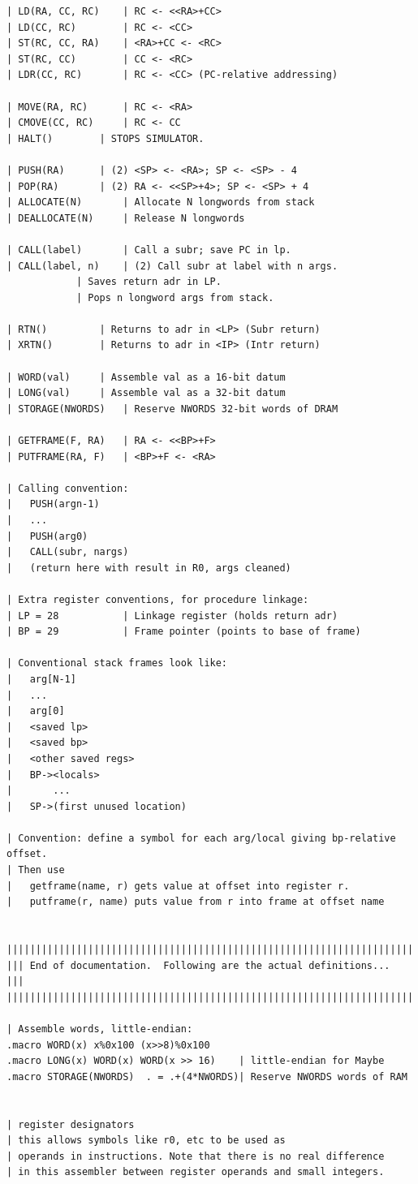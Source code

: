 \documentclass{article}
\begin{document}
\begin{lstlisting}
| LD(RA, CC, RC)	| RC <- <<RA>+CC>
| LD(CC, RC)		| RC <- <CC>
| ST(RC, CC, RA)	| <RA>+CC <- <RC>
| ST(RC, CC)		| CC <- <RC>
| LDR(CC, RC)		| RC <- <CC> (PC-relative addressing)

| MOVE(RA, RC)		| RC <- <RA>
| CMOVE(CC, RC)		| RC <- CC
| HALT()		| STOPS SIMULATOR.

| PUSH(RA)		| (2) <SP> <- <RA>; SP <- <SP> - 4
| POP(RA)		| (2) RA <- <<SP>+4>; SP <- <SP> + 4
| ALLOCATE(N)		| Allocate N longwords from stack
| DEALLOCATE(N)		| Release N longwords

| CALL(label)		| Call a subr; save PC in lp.
| CALL(label, n)	| (2) Call subr at label with n args.
			| Saves return adr in LP.
			| Pops n longword args from stack.

| RTN()			| Returns to adr in <LP> (Subr return)
| XRTN()		| Returns to adr in <IP> (Intr return)

| WORD(val)		| Assemble val as a 16-bit datum
| LONG(val)		| Assemble val as a 32-bit datum
| STORAGE(NWORDS)	| Reserve NWORDS 32-bit words of DRAM

| GETFRAME(F, RA)	| RA <- <<BP>+F>
| PUTFRAME(RA, F)	| <BP>+F <- <RA>

| Calling convention:
|	PUSH(argn-1)
|	...
|	PUSH(arg0)
|	CALL(subr, nargs)
|	(return here with result in R0, args cleaned)

| Extra register conventions, for procedure linkage:
| LP = 28			| Linkage register (holds return adr)
| BP = 29			| Frame pointer (points to base of frame)

| Conventional stack frames look like:
|	arg[N-1]
|	...
|	arg[0]
|	<saved lp>
|	<saved bp>
|	<other saved regs>
|   BP-><locals>
|       ...
|   SP->(first unused location)

| Convention: define a symbol for each arg/local giving bp-relative offset.
| Then use
|   getframe(name, r) gets value at offset into register r.
|   putframe(r, name) puts value from r into frame at offset name


||||||||||||||||||||||||||||||||||||||||||||||||||||||||||||||||||||||||
||| End of documentation.  Following are the actual definitions...   |||
||||||||||||||||||||||||||||||||||||||||||||||||||||||||||||||||||||||||

| Assemble words, little-endian:
.macro WORD(x) x%0x100 (x>>8)%0x100 
.macro LONG(x) WORD(x) WORD(x >> 16)	| little-endian for Maybe
.macro STORAGE(NWORDS)	. = .+(4*NWORDS)| Reserve NWORDS words of RAM


| register designators
| this allows symbols like r0, etc to be used as
| operands in instructions. Note that there is no real difference
| in this assembler between register operands and small integers.


\end{lstlisting}
\end{document}
